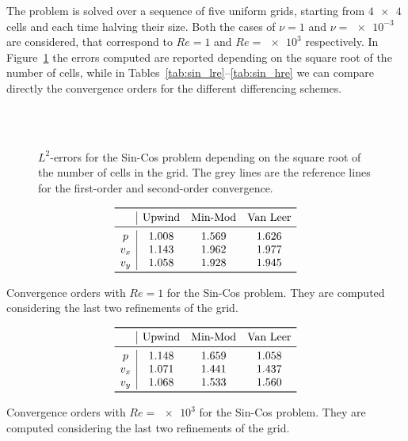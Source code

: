 The problem is solved over a sequence of five uniform grids, starting from 
$\num{4x4}$ cells and each time halving their size. Both the cases of $\nu=1$ 
and $\nu=\num{e-3}$ are considered, that correspond to $Re=1$ and $Re=\num{e3}$ 
respectively. In Figure~\ref{fig:sin_err} the errors computed are reported 
depending on the square root of the number of cells, while in 
Tables~\ref{tab:sin_lre}--\ref{tab:sin_hre} we can compare directly the 
convergence orders for the different differencing schemes.
\begin{figure}
	\centering
	\subfloat[Upwind, $Re = 1$]{
		}
	\subfloat[Upwind, $Re = \num{e3}$]{
		}\\
	\subfloat[Min-Mod, $Re = 1$]{
		}
	\subfloat[Min-Mod, $Re = \num{e3}$]{
		}\\
	\subfloat[Van Leer, $Re = 1$]{
		}
	\subfloat[Van Leer, $Re = \num{e3}$]{
		}
	\caption[$L^2$-errors for the Sin-Cos problem]{$L^2$-errors for the Sin-Cos 
	problem depending on the square root of the number of cells in the grid. 
	The grey lines are the reference lines for the first-order and second-order 
	convergence.}
	\label{fig:sin_err}
\end{figure}
\begin{table}
	\centering
	\[
	\begin{array}{c|ccc}
	\toprule
	& \text{Upwind} & \text{Min-Mod} & \text{Van Leer} \\ 
	\midrule
	p & 1.008 & 1.569 & 1.626\\
	v_x & 1.143 & 1.962 & 1.977\\
	v_y & 1.058 & 1.928 & 1.945\\
	\bottomrule
	\end{array}
	\]
	\caption[Convergence orders with $Re = 1$ for the Sin-Cos 
	problem]{Convergence orders with $Re = 1$ for the Sin-Cos problem. They are 
	computed considering the last two refinements of the grid.}
	\label{tab:sin_lre}
	\[
	\begin{array}{c|ccc}
	\toprule
	& \text{Upwind} & \text{Min-Mod} & \text{Van Leer} \\ 
	\midrule
	p & 1.148 & 1.659 & 1.058\\
	v_x & 1.071 & 1.441 & 1.437\\
	v_y & 1.068 & 1.533 & 1.560\\
	\bottomrule
	\end{array}
	\]
	\caption[Convergence orders with $Re = \num{e3}$ for the Sin-Cos 
	problem]{Convergence orders with $Re = \num{e3}$ for the Sin-Cos problem. 
	They are computed considering the last two refinements of the grid.}
	\label{tab:sin_hre}
\end{table}

